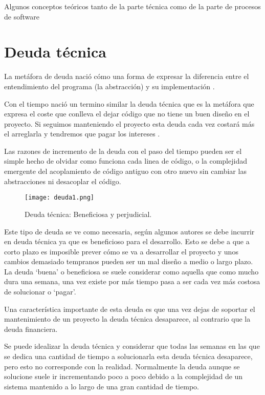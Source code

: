 
Algunos conceptos teóricos tanto de la parte técnica como de la parte de procesos de software


\section{Deuda técnica}

La metáfora de deuda nació cómo una forma de expresar la diferencia entre el entendimiento del programa (la abstracción) y su implementación \cite{cu09}.

Con el tiempo nació un termino similar la deuda técnica que es la metáfora que expresa el coste que conlleva el dejar código que no tiene un buen diseño en el proyecto. Si seguimos manteniendo el proyecto esta deuda cada vez costará más el arreglarla y tendremos que pagar los intereses \cite{fow03}.

Las razones de incremento de la deuda con el paso del tiempo pueden ser el simple hecho de olvidar como funciona cada linea de código, o la complejidad emergente del acoplamiento de código antiguo con otro nuevo sin cambiar las abstracciones ni desacoplar el código.

\begin{figure}
	\centering
	\texttt{[image: deuda1.png]}
	\caption{Deuda técnica: Beneficiosa y perjudicial.\cite{kni13}}\label{fig:deuda1.png}
\end{figure}


Este tipo de deuda se ve como necesaria, según algunos autores \cite{kni13} se debe incurrir en deuda técnica ya que es beneficioso para el desarrollo. Esto se debe a que a corto plazo es imposible prever cómo se va a desarrollar el proyecto y unos cambios demasiado tempranos pueden ser un mal diseño a medio o largo plazo. La deuda `buena' o beneficiosa se suele considerar como aquella que como mucho dura una semana, una vez existe por más tiempo pasa a ser cada vez más costosa de solucionar o `pagar'.


Una característica importante de esta deuda es que una vez dejas de soportar el mantenimiento de un proyecto la deuda técnica desaparece, al contrario que la deuda financiera.

Se puede idealizar la deuda técnica y considerar que todas las semanas en las que se dedica una cantidad de tiempo a solucionarla esta deuda técnica desaparece, pero esto no corresponde con la realidad. Normalmente la deuda aunque se solucione suele ir incrementando poco a poco debido a la complejidad de un sistema mantenido a lo largo de una gran cantidad de tiempo.

